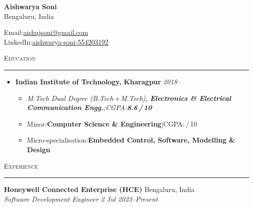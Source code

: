 \documentclass[9pt]{article}
\newcommand{\ressection}[1]{%
  \vspace{5pt}%
  \noindent\textsc{#1}\\[-8pt]%
  \noindent\rule{\textwidth}{0.4pt}\vspace{4pt}%
}
\begin{document}
\enlargethispage{20pt}

\begin{minipage}[t]{0.57\linewidth}
  {\LARGE\bfseries Aishwarya Soni}\\[2pt]
  Bengaluru, India
\end{minipage}%
\begin{minipage}[t]{0.43\linewidth}
  \raggedleft
  {\small Email:\;\href{mailto:aishujsoni@gmail.com}{aishujsoni@gmail.com}}\\[1pt]
  {\small LinkedIn:\;\href{https://www.linkedin.com/in/aishwarya-soni-554203192/}{aishwarya-soni-554203192}}
\end{minipage}

\vspace{10pt}

\ressection{Education}

\begin{itemize}
  \item \textbf{Indian Institute of Technology, Kharagpur} \hfill \textit{2018\;--}
    \begin{itemize}
      \item \textit{M.Tech Dual Degree (B.Tech\,+\,M.Tech), \textbf{Electronics \& Electrical Communication Engg.};\;CGPA:\;\textbf{8.6\,/\,10}}
      \item Minor:\;\textbf{Computer Science \& Engineering}\;|\;CGPA:\,/\,10
      \item Micro-specialisation:\;\textbf{Embedded Control, Software, Modelling \& Design}
    \end{itemize}
\end{itemize}

\ressection{Experience}

\noindent\textbf{Honeywell Connected Enterprise (HCE)} \hfill Bengaluru, India\\
\textit{Software Development Engineer 2} \hfill \textit{Jul 2023\;--\;Present}
\end{document}

